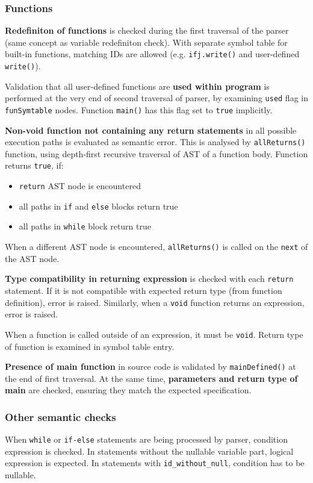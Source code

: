 \documentclass[a4paper, 11pt]{article}
\begin{document}
\subsubsection{Functions}
\textbf{Redefiniton of functions} is checked during the first traversal of the parser (same concept as variable redefiniton check).
With separate symbol table for built-in functions, matching IDs are allowed (e.g. \verb|ifj.write()| and user-defined \verb|write()|).
\par
Validation that all user-defined functions are \textbf{used within program} is performed at the very end of second traversal of parser,
by examining \verb|used| flag in \verb|funSymtable| nodes. Function \verb|main()| has this flag set to \verb|true| implicitly. 
\par
\textbf{Non-void function not containing any return statements} in all possible execution paths is evaluated as semantic error.
This is analysed by \verb|allReturns()| function, using depth-first recursive traversal of AST of a function body.
Function returns \verb|true|, if:
\begin{itemize}
    \item \verb|return| AST node is encountered
    \item all paths in \verb|if| and \verb|else| blocks return true
    \item all paths in \verb|while| block return true
\end{itemize}
When a different AST node is encountered, \verb|allReturns()| is called on the \verb|next| of the AST node.
\par
\textbf{Type compatibility in returning expression} is checked with each \verb|return| statement. If it is not compatible with
expected return type (from function definition), error is raised. Similarly, when a \verb|void| function returns an expression,
error is raised.
\par
When a function is called outside of an expression, it must be \verb|void|. Return type of function is examined in 
symbol table entry.
\par
\textbf{Presence of main function} in source code is validated by \verb|mainDefined()| at the end of first traversal.
At the same time, \textbf{parameters and return type of main} are checked, ensuring they match the expected specification.

\subsubsection{Other semantic checks}
When \verb|while| or \verb|if-else| statements are being processed by parser, condition expression is checked.
In statements without the nullable variable part, logical expression is expected. In statements with \verb|id_without_null|,
condition has to be nullable.
\end{document}
